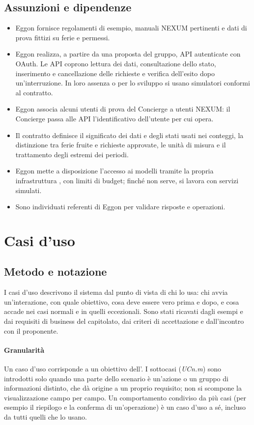 \documentclass[documento]{gpt}
\begin{document}
\subsection{Assunzioni e dipendenze}
\begin{itemize}
  \item Eggon fornisce regolamenti di esempio, manuali NEXUM pertinenti e dati
        di prova fittizi su ferie e permessi.
  \item Eggon realizza, a partire da una proposta del gruppo, API autenticate con
        OAuth. Le API coprono lettura dei dati, consultazione dello stato,
        inserimento e cancellazione delle richieste e verifica dell'esito dopo
        un'interruzione. In loro assenza o per lo sviluppo si usano simulatori
        conformi al contratto.
  \item Eggon associa alcuni utenti di prova del Concierge a utenti NEXUM: il
        Concierge passa alle API l'identificativo dell'utente per cui opera.
  \item Il contratto definisce il significato dei dati e degli stati usati nei
        conteggi, la distinzione tra ferie fruite e richieste approvate, le
        unità di misura e il trattamento degli estremi dei periodi.
  \item Eggon mette a disposizione l'accesso ai modelli tramite la propria
        infrastruttura , con limiti di budget; finché non serve, si lavora con
        servizi simulati.
  \item Sono individuati referenti di Eggon per validare risposte e operazioni.
\end{itemize}

\section{Casi d'uso}\label{sec:uc}

\subsection{Metodo e notazione}
I casi d'uso descrivono il sistema dal punto di vista di chi lo usa: chi avvia
un'interazione, con quale obiettivo, cosa deve essere vero prima e dopo, e cosa
accade nei casi normali e in quelli eccezionali. Sono stati ricavati dagli
esempi e dai requisiti di business del capitolato, dai criteri di
accettazione e dall'incontro con il proponente.

\paragraph{Granularità} Un caso d'uso corrisponde a un obiettivo dell'. I
sottocasi (\textit{UCn.m}) sono introdotti solo quando una parte dello scenario
è un'azione o un gruppo di informazioni distinto, che dà origine a un proprio
requisito; non si scompone la visualizzazione campo per campo. Un comportamento
condiviso da più casi (per esempio il riepilogo e la conferma di
un'operazione) è un caso d'uso a sé, incluso da tutti quelli che lo usano.
\end{document}

